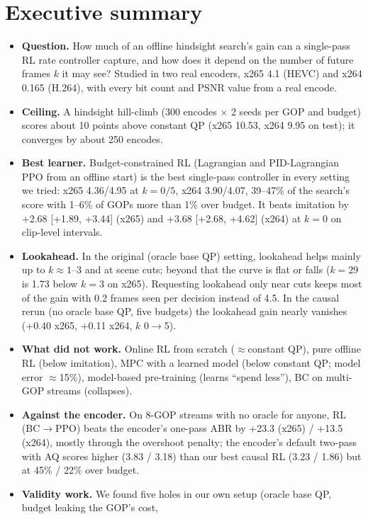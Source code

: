 \documentclass[10pt,a4paper]{article}
\begin{document}
\section{Executive summary}
\begin{itemize}
\item \textbf{Question.} How much of an offline hindsight search's gain can a single-pass RL rate controller capture,
and how does it depend on the number of future frames $k$ it may see? Studied in two real encoders, x265 4.1 (HEVC)
and x264 0.165 (H.264), with every bit count and PSNR value from a real encode.
\item \textbf{Ceiling.} A hindsight hill-climb (300 encodes $\times$ 2 seeds per GOP and budget) scores about 10 points
above constant QP (x265 10.53, x264 9.95 on test); it converges by about 250 encodes.
\item \textbf{Best learner.} Budget-constrained RL (Lagrangian and PID-Lagrangian PPO from an offline start) is the
best single-pass controller in every setting we tried: x265 4.36/4.95 at $k=0/5$, x264 3.90/4.07, 39--47\% of the
search's score with 1--6\% of GOPs more than 1\% over budget. It beats imitation by +2.68 [+1.89, +3.44] (x265)
and +3.68 [+2.68, +4.62] (x264) at $k=0$ on clip-level intervals.
\item \textbf{Lookahead.} In the original (oracle base QP) setting, lookahead helps mainly up to $k\approx1$--3 and
at scene cuts; beyond that the curve is flat or falls ($k=29$ is 1.73 below $k=3$ on x265). Requesting lookahead
only near cuts keeps most of the gain with 0.2 frames seen per decision instead of 4.5. In the causal rerun (no
oracle base QP, five budgets) the lookahead gain nearly vanishes (+0.40 x265, +0.11 x264, $k$ 0$\to$5).
\item \textbf{What did not work.} Online RL from scratch ($\approx$constant QP), pure offline RL (below imitation),
MPC with a learned model (below constant QP; model error $\approx$15\%), model-based pre-training (learns ``spend
less''), BC on multi-GOP streams (collapses).
\item \textbf{Against the encoder.} On 8-GOP streams with no oracle for anyone, RL (BC$\to$PPO) beats the encoder's
one-pass ABR by +23.3 (x265) / +13.5 (x264), mostly through the overshoot penalty; the encoder's default two-pass with
AQ scores higher (3.83 / 3.18) than our best causal RL (3.23 / 1.86) but at 45\% / 22\% over budget.
\item \textbf{Validity work.} We found five holes in our own setup (oracle base QP, budget leaking the GOP's cost,

\end{itemize}
\end{document}
